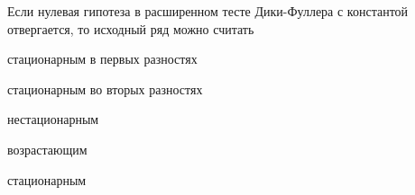
\begin{question}
Если нулевая гипотеза в расширенном тесте Дики-Фуллера с константой отвергается, то
исходный ряд можно считать
\begin{answerlist}
  \item стационарным в первых разностях
  \item стационарным во вторых разностях
  \item нестационарным
  \item возрастающим
  \item стационарным
\end{answerlist}
\end{question}


